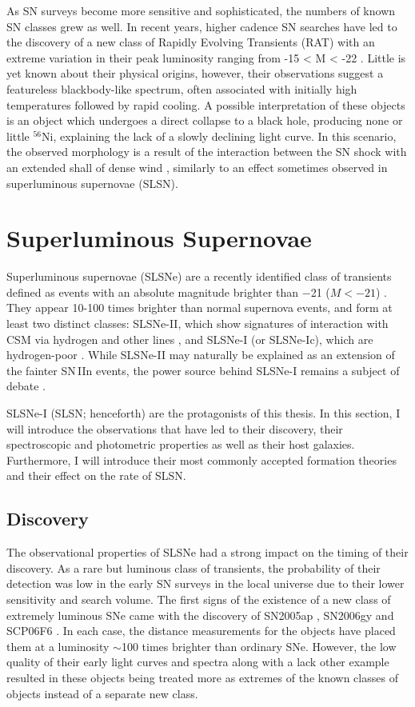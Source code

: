 As SN surveys become more sensitive and sophisticated, the numbers of known SN classes grew as well. In recent years, higher cadence SN searches have led to the discovery of a new class of Rapidly Evolving Transients (RAT) with an extreme variation in their peak luminosity ranging from -15 < M < -22 \citep{Pursiainen2018}. Little is yet known about their physical origins, however, their observations suggest a featureless blackbody-like spectrum, often associated with initially high temperatures followed by rapid cooling. A possible interpretation of these objects is an object which undergoes a direct collapse to a black hole, producing none or little $^{56}$Ni, explaining the lack of a slowly declining light curve. In this scenario, the observed morphology is a result of the interaction between the SN shock with an extended shall of dense wind \citep{Piro2015}, similarly to an effect sometimes observed in superluminous supernovae (SLSN).

\section{Superluminous Supernovae}
Superluminous supernovae (SLSNe) are a recently identified class of transients defined as events with an absolute magnitude brighter than $-$21 ($M<-21$) \citep{Gal-Yam2012}. They appear 10-100 times brighter than normal supernova events, and form at least two distinct classes: SLSNe-II, which show signatures of interaction with CSM via hydrogen and other lines \citep{Ofek2006,Smith2006,Drake2011}, and SLSNe-I (or SLSNe-Ic), which are hydrogen-poor \citep{Quimby2011}. While SLSNe-II may naturally be explained as an extension of the fainter SN\,IIn events, the power source behind SLSNe-I remains a subject of debate \citep{Gal-Yam2012}.

SLSNe-I (SLSN; henceforth) are the protagonists of this thesis. In this section, I will introduce the observations that have led to their discovery, their spectroscopic and photometric properties as well as their host galaxies. Furthermore, I will introduce their most commonly accepted formation theories and their effect on the rate of SLSN.

\subsection{Discovery}
The observational properties of SLSNe had a strong impact on the timing of their discovery. As a rare but luminous class of transients, the probability of their detection was low in the early SN surveys in the local universe due to their lower sensitivity and search volume. The first signs of the existence of a new class of extremely luminous SNe came with the discovery of SN2005ap \citep{Quimby2007}, SN2006gy \citep{Ofek2007} and SCP06F6 \citep{Barbary2009}. In each case, the distance measurements for the objects have placed them at a luminosity $\sim$100 times brighter than ordinary SNe. However, the low quality of their early light curves and spectra along with a lack other example resulted in these objects being treated more as extremes of the known classes of objects instead of a separate new class.

